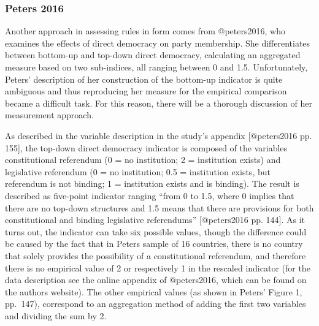 \documentclass[]{article}
\begin{document}
\subsubsection{Peters 2016}\label{peters-2016}

Another approach in assessing rules in form comes from @peters2016, who
examines the effects of direct democracy on party membership. She
differentiates between bottom-up and top-down direct democracy,
calculating an aggregated measure based on two sub-indices, all ranging
between 0 and 1.5. Unfortunately, Peters' description of her
construction of the bottom-up indicator is quite ambiguous and thus
reproducing her measure for the empirical comparison became a difficult
task. For this reason, there will be a thorough discussion of her
measurement approach.

As described in the variable description in the study's appendix
{[}@peters2016 pp. 155{]}, the top-down direct democracy indicator is
composed of the variables constitutional referendum (0 = no institution;
2 = institution exists) and legislative referendum (0 = no institution;
0.5 = institution exists, but referendum is not binding; 1 = institution
exists and is binding). The result is described as five-point indicator
ranging ``from 0 to 1.5, where 0 implies that there are no top-down
structures and 1.5 means that there are provisions for both
constitutional and binding legislative referendums'' {[}@peters2016 pp.
144{]}. As it turns out, the indicator can take six possible values,
though the difference could be caused by the fact that in Peters sample
of 16 countries, there is no country that solely provides the
possibility of a constitutional referendum, and therefore there is no
empirical value of 2 or respectively 1 in the rescaled indicator (for
the data description see the online appendix of @peters2016, which can
be found on the authors website). The other empirical values (as shown
in Peters' Figure 1, pp.~147), correspond to an aggregation method of
adding the first two variables and dividing the sum by 2.
\end{document}
